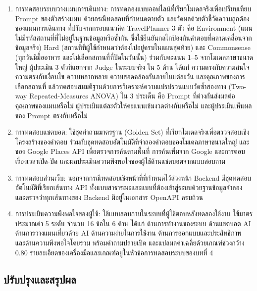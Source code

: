 \begin{enumerate}
\item การทดสอบระบบวางแผนการเดินทาง: การทดลองแบบออฟไลน์ที่เรียกโมเดลจริงเพื่อเปรียบเทียบ Prompt ของตัวสร้างแผน ด้วยกรณีทดสอบที่กำหนดตายตัว และวัดผลด้วยตัวชี้วัดความถูกต้องของแผนการเดินทาง ที่ปรับจากกรอบแนวคิด TravelPlanner \parencite{xie2024} 3 ตัว คือ Environment (แผนไม่มีรหัสสถานที่ที่ไม่อยู่ในฐานข้อมูลหรือซ้ำกัน ซึ่งใช้ยืนยันกลไกป้องกันคำตอบที่คลาดเคลื่อนจากข้อมูลจริง) Hard (สถานที่ที่ผู้ใช้กำหนดว่าต้องไปอยู่ครบในแผนสุดท้าย) และ Commonsense (ทุกวันมีมื้ออาหาร และไม่เลือกสถานที่ที่ปิดในวันนั้น) ร่วมกับคะแนน 1--5 จากโมเดลภาษาขนาดใหญ่ ผู้ประเมิน 3 ตัวที่แยกจาก Judge ในระบบจริง ใน 5 ด้าน ได้แก่ ความตรงกับความสนใจ ความตรงกับเงื่อนไข ความหลากหลาย ความสอดคล้องกันภายในแต่ละวัน และคุณภาพของการเลือกสถานที่ แล้วทดสอบสมมติฐานด้วยการวิเคราะห์ความแปรปรวนแบบวัดซ้ำสองทาง (Two-way Repeated-Measures ANOVA) ใน 3 ประเด็น คือ Prompt ที่ต่างกันส่งผลต่อคุณภาพของแผนหรือไม่ ผู้ประเมินแต่ละตัวให้คะแนนเข้มงวดต่างกันหรือไม่ และผู้ประเมินเห็นผลของ Prompt ตรงกันหรือไม่

\item การทดสอบแชตบอต: ใช้ชุดคำถามมาตรฐาน (Golden Set) ที่เรียกโมเดลจริงเพื่อตรวจสอบเชิงโครงสร้างของคำตอบ ร่วมกับชุดทดสอบอัตโนมัติที่จำลองคำตอบของโมเดลภาษาขนาดใหญ่ และของ Google Places API เพื่อตรวจการค้นตามพื้นที่ การค้นเพิ่มจาก Google และการตอบเรื่องเวลาเปิด-ปิด และผลประเมินความพึงพอใจของผู้ใช้ด้านแชตบอตจากแบบสอบถาม

\item การทดสอบส่วนเว็บ: นอกจากกรณีทดสอบเชิงหน้าที่ที่กำหนดไว้ล่วงหน้า Backend มีชุดทดสอบอัตโนมัติที่เรียกเส้นทาง API ทั้งแบบสาธารณะและแบบที่ต้องเข้าสู่ระบบด้วยฐานข้อมูลจำลอง และตรวจว่าทุกเส้นทางของ Backend มีอยู่ในเอกสาร OpenAPI ครบถ้วน

\item การประเมินความพึงพอใจของผู้ใช้: ใช้แบบสอบถามในระบบที่ผู้ใช้ตอบหลังทดลองใช้งาน ใช้มาตรประมาณค่า 5 ระดับ จำนวน 16 ข้อใน 6 ด้าน ได้แก่ ด้านการทำงานของระบบ ด้านแชตบอต AI ด้านการวางแผนเที่ยวด้วย AI ด้านความง่ายในการใช้งาน ด้านการออกแบบและประสิทธิภาพ และด้านความพึงพอใจโดยรวม พร้อมคำถามปลายเปิด และแปลผลค่าเฉลี่ยด้วยเกณฑ์ช่วงกว้าง 0.80 \parencite{best1981} รายละเอียดของเครื่องมือและเกณฑ์อยู่ในหัวข้อการทดสอบระบบของบทที่ 4
\end{enumerate}

\subsection{ปรับปรุงและสรุปผล}

